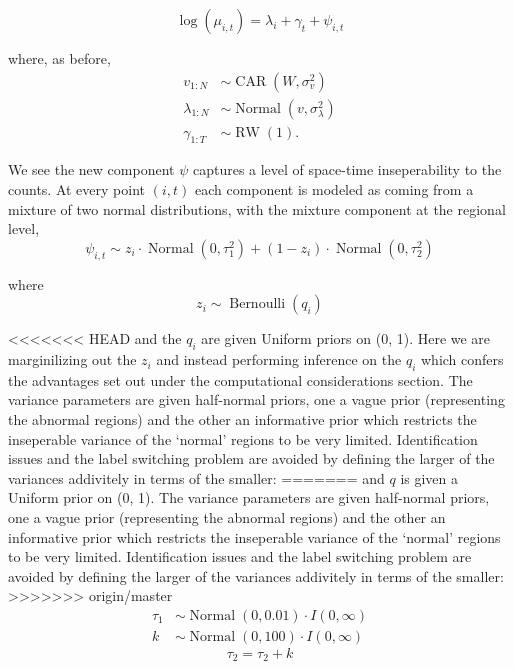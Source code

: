 \documentclass{article}
\begin{document}
\begin{equation}
\log(\mu_{i,t}) = \lambda_i + \gamma_t + \psi_{i,t}
\end{equation}

where, as before,
\begin{align}
v_{1:N} &\sim \operatorname{CAR}(W, \sigma_v^2) \\
\lambda_{1:N} &\sim \operatorname{Normal}(v, \sigma_\lambda^2) \\
\gamma_{1:T} &\sim \operatorname{RW}(1).
\end{align}

We see the new component $\psi$ captures a level of space-time inseperability to the counts. At every point $(i, t)$ each component is modeled as coming from a mixture of two normal distributions, with the mixture component at the regional level,
\begin{equation}
\psi_{i,t} \sim z_i \cdot \operatorname{Normal}(0, \tau_1^2) + (1 - z_i) \cdot \operatorname{Normal}(0, \tau_2^2)
\end{equation} 

where
\begin{equation}
  z_i \sim \operatorname{Bernoulli}(q_i)
\end{equation}

<<<<<<< HEAD
and the $q_i$ are given Uniform priors on (0, 1). Here we are marginilizing out the $z_i$ and instead performing inference on the $q_i$ which confers the advantages set out under the computational considerations section. The variance parameters are given half-normal priors, one a vague prior (representing the abnormal regions) and the other an informative prior which restricts the inseperable variance of the `normal' regions to be very limited. Identification issues and the label switching problem are avoided by defining the larger of the variances addivitely in terms of the smaller:
=======
and $q$ is given a Uniform prior on (0, 1). The variance parameters are given half-normal priors, one a vague prior (representing the abnormal regions) and the other an informative prior which restricts the inseperable variance of the `normal' regions to be very limited. Identification issues and the label switching problem are avoided by defining the larger of the variances addivitely in terms of the smaller:
>>>>>>> origin/master
\begin{align}
  \tau_1 &\sim \operatorname{Normal}(0, 0.01) \cdot I(0, \infty) \\
  k &\sim \operatorname{Normal}(0, 100) \cdot I(0, \infty)
\end{align}
\begin{equation}
 \tau_2 = \tau_2 + k
\end{equation}
\end{document}
